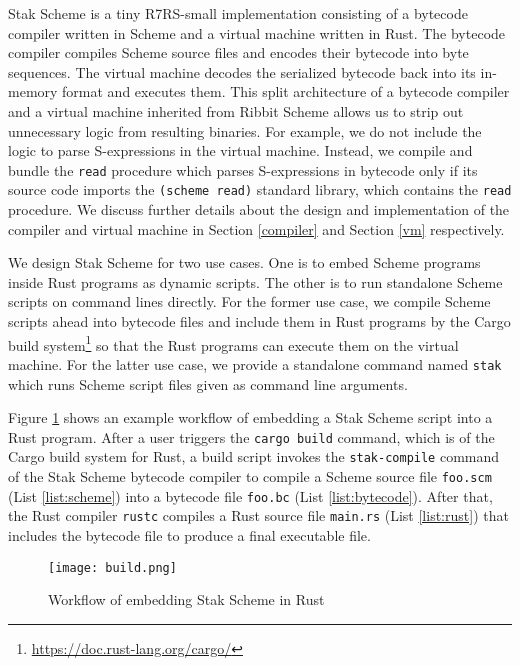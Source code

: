 \documentclass[sigplan, anonymous, review]{acmart}
\begin{document}
Stak Scheme is a tiny R7RS-small implementation consisting of a
bytecode compiler written in Scheme and a virtual machine written in Rust.
The bytecode compiler compiles Scheme source files and encodes their bytecode
into byte sequences.
The virtual machine decodes the serialized bytecode back into its
in-memory format and executes them.
This split architecture of a bytecode compiler and a virtual machine inherited
from Ribbit Scheme allows us to strip
out unnecessary logic from resulting binaries.
For example, we do not include the logic to parse S-expressions
in the virtual machine.
Instead, we compile and bundle the \texttt{read} procedure which parses
S-expressions in bytecode only if its source code imports the
\texttt{(scheme read)} standard library, which contains the
\texttt{read} procedure.
We discuss further details about the design and implementation of the
compiler and virtual machine in Section \ref{compiler} and Section
\ref{vm} respectively.

We design Stak Scheme for two use cases. One is to embed Scheme
programs inside Rust programs as dynamic scripts.
The other is to run standalone Scheme scripts on command lines directly.
For the former use case, we
compile Scheme scripts ahead into bytecode files and include them in
Rust programs by the Cargo build
system\footnote{\url{https://doc.rust-lang.org/cargo/}} so that the
Rust programs can execute them on the virtual machine.
For the latter use case, we
provide a standalone command named \texttt{stak} which runs Scheme script
files given as command line arguments.

Figure \ref{figure:build} shows an example workflow of
embedding a Stak Scheme script into a Rust program.
After a user triggers the \texttt{cargo build} command, which is of the
Cargo build system for Rust, a build
script invokes the \texttt{stak-compile} command of the Stak Scheme
bytecode compiler to compile a Scheme source file \texttt{foo.scm}
(List \ref{list:scheme}) into a bytecode file \texttt{foo.bc}
(List \ref{list:bytecode}).
After that, the Rust compiler \texttt{rustc} compiles a Rust source file
\texttt{main.rs} (List \ref{list:rust}) that includes the bytecode
file to produce a final executable file.

\begin{figure}
  \begin{center}
    \caption{Workflow of embedding Stak Scheme in Rust}
    \label{figure:build}
    \vspace{1em}
    \texttt{[image: build.png]}
  \end{center}
\end{figure}
\end{document}
